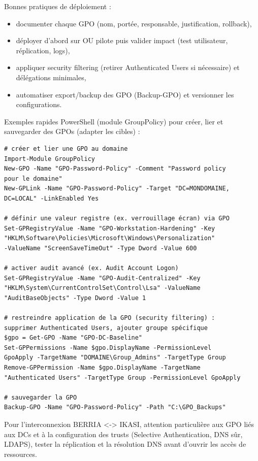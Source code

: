 \newpage

\noindent Bonnes pratiques de déploiement :
\begin{itemize}
	\item documenter chaque GPO (nom, portée, responsable, justification, rollback),
	\item déployer d'abord sur OU pilote puis valider impact (test utilisateur, réplication, logs),
	\item appliquer security filtering (retirer Authenticated Users si nécessaire) et délégations minimales,
	\item automatiser export/backup des GPO (Backup-GPO) et versionner les configurations.
\end{itemize}

\noindent Exemples rapides PowerShell (module GroupPolicy) pour créer, lier et sauvegarder des GPOs (adapter les cibles) :

\begin{verbatim}
# créer et lier une GPO au domaine
Import-Module GroupPolicy
New-GPO -Name "GPO-Password-Policy" -Comment "Password policy 
pour le domaine"
New-GPLink -Name "GPO-Password-Policy" -Target "DC=MONDOMAINE,
DC=LOCAL" -LinkEnabled Yes

# définir une valeur registre (ex. verrouillage écran) via GPO
Set-GPRegistryValue -Name "GPO-Workstation-Hardening" -Key 
"HKLM\Software\Policies\Microsoft\Windows\Personalization" 
-ValueName "ScreenSaveTimeOut" -Type Dword -Value 600

# activer audit avancé (ex. Audit Account Logon)
Set-GPRegistryValue -Name "GPO-Audit-Centralized" -Key 
"HKLM\System\CurrentControlSet\Control\Lsa" -ValueName 
"AuditBaseObjects" -Type Dword -Value 1

# restreindre application de la GPO (security filtering) : 
supprimer Authenticated Users, ajouter groupe spécifique
$gpo = Get-GPO -Name "GPO-DC-Baseline"
Set-GPPermissions -Name $gpo.DisplayName -PermissionLevel 
GpoApply -TargetName "DOMAINE\Group_Admins" -TargetType Group
Remove-GPPermission -Name $gpo.DisplayName -TargetName 
"Authenticated Users" -TargetType Group -PermissionLevel GpoApply

# sauvegarder la GPO
Backup-GPO -Name "GPO-Password-Policy" -Path "C:\GPO_Backups"
\end{verbatim}

\noindent Pour l'interconnexion BERRIA <-> IKASI, attention particulière aux GPO liés aux DCs et à la configuration des trusts (Selective Authentication, DNS sûr, LDAPS), tester la réplication et la résolution DNS avant d'ouvrir les accès de ressources.

